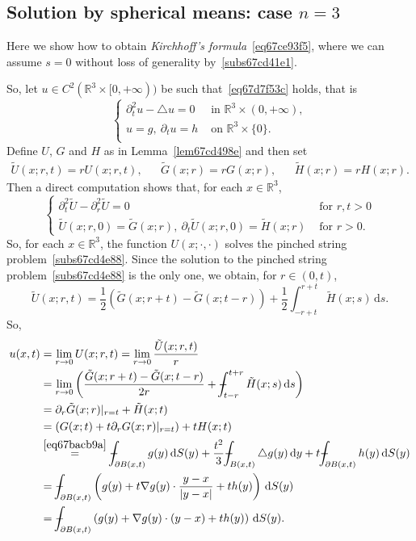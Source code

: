 \documentclass[a4paper,9pt]{amsart}
\newcommand{\R}{\mathbb{R}}	%
\newcommand{\did}{\,\mathrm{d}}	%
\newcommand{\de}{\partial}		%
\newcommand{\laplacian}{\triangle}
\newcommand{\grad}{\nabla}
\def\Xint#1{\mathchoice
      {\XXint\displaystyle\textstyle{#1}}%
      {\XXint\textstyle\scriptstyle{#1}}%
      {\XXint\scriptstyle\scriptscriptstyle{#1}}%
      {\XXint\scriptscriptstyle\scriptscriptstyle{#1}}%
      \!\int}
\def\XXint#1#2#3{{\setbox0=\hbox{$#1{#2#3}{\int}$}
        \vcenter{\hbox{$#2#3$}}\kern-.5\wd0}}
\def\fint{\Xint-}
\theoremstyle{plain}
\theoremstyle{definition}
\theoremstyle{remark}
\begin{document}
\subsection{Solution by spherical means: case $n=3$}\label{subs67ce94a5}
Here we show how to obtain \emph{Kirchhoff's formula}~\eqref{eq67ce93f5},
where we can assume $s=0$ without loss of generality by~\ref{subs67cd41e1}.

So, let $u\in C^2(\R^3\times[0,+\infty))$ be such that~\eqref{eq67d7f53c} holds, that is
\begin{equation}
\begin{cases}
	\de_t^2u-\laplacian u = 0 & \text{ in }\R^3\times(0,+\infty) , \\
	u = g,\ \de_t u = h & \text{ on }\R^3\times\{0\} . \\
\end{cases}
\end{equation}
Define $U$, $G$ and $H$ as in Lemma~\ref{lem67cd498e} and then set
\begin{align}
	\tilde U(x;r,t) = r U(x;r,t) ,
	&& 
	\tilde G(x;r) = r G(x;r) ,
	&&
	\tilde H(x;r) = r H(x;r) .
\end{align}
Then a direct computation shows that, for each $x\in\R^3$,
\begin{equation}
\begin{cases}
	\de_t^2 \tilde U - \de_r^2 \tilde U = 0 & \text{ for }r,t>0 \\
	\tilde U(x;r,0) = \tilde G(x;r) , \ 
	\de_t \tilde U(x;r,0) = \tilde H(x;r)
	& \text{ for }r>0 .
\end{cases}
\end{equation}
So, for each $x\in\R^3$, the function $U(x;\cdot,\cdot)$ solves the pinched string problem~\ref{subs67cd4e88}.
Since the solution to the pinched string problem~\ref{subs67cd4e88} is the only one,
we obtain, for $r\in(0,t)$,
\begin{equation}
	\tilde U (x;r,t) = \frac12 (\tilde G(x;r+t)-\tilde G(x;t-r)) + \frac12 \int_{-r+t}^{r+t} \tilde H(x;s) \did s .
\end{equation}
So,
\begin{align*}
 	u(x,t)
	&= \lim_{r\to0} U(x;r,t) 
	= \lim_{r\to0} \frac{ \tilde U(x;r,t)}{r} \\
	&= \lim_{r\to0} \left( \frac{\tilde G(x;r+t) - \tilde G(x;t-r) }{2r} 
		+ \fint_{t-r}^{t+r} \tilde H(x;s) \did s \right) \\
	&= \de_r\tilde G(x;r)|_{r=t} + \tilde H(x;t) \\
	&= (G(x;t) + t\de_r G(x;r)|_{r=t}) + t H(x;t) \\
	&\overset{\eqref{eq67bacb9a}}= \fint_{\de B(x,t)} g(y) \did S(y) 
		+ \frac{t^2}{3} \fint_{B(x,t)} \laplacian g(y) \did y 
		+ t \fint_{\de B(x,t)} h(y) \did S(y) \\
	&= \fint_{\de B(x,t)} \left( g(y) + t \grad g(y)\cdot \frac{y-x}{|y-x|} + th(y) \right) \did S(y) \\
	&= \fint_{\de B(x,t)} \left( g(y) + \grad g(y)\cdot (y-x) + th(y) \right) \did S(y) .
\end{align*}
\end{document}
